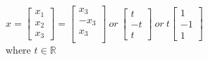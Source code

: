 \documentclass[12pt,letterpaper, onecolumn]{exam}
\begin{document}
\begin{questions}
\begin{solution}
\begin{center}
            $x = \begin{bmatrix}
                x_1\\
                x_2\\
                x_3
            \end{bmatrix}
            =
            \begin{bmatrix}
                x_3\\
                -x_3\\
                x_3\\
            \end{bmatrix}\ or\ 
            \begin{bmatrix}
                t\\
                -t\\
                t
            \end{bmatrix}\ or\
            t \begin{bmatrix}
                1\\
                -1\\
                1
            \end{bmatrix}
            $\\
            where $t \in \mathbb{R}$\\
        \end{center}

    \end{solution}
    \pagebreak


\end{questions}
\end{document}

